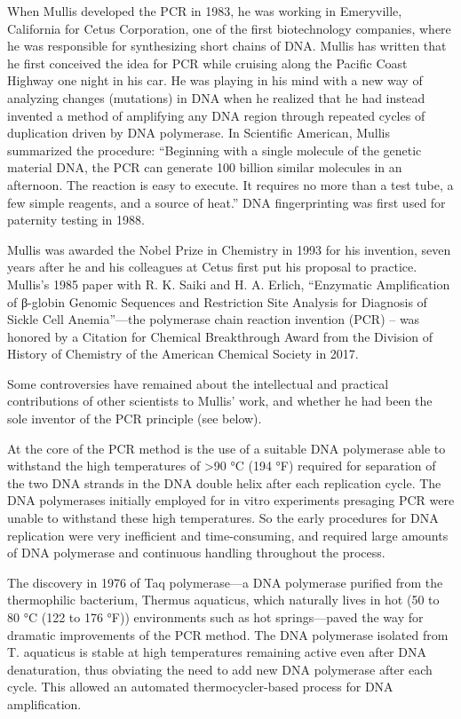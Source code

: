 When Mullis developed the PCR in 1983, he was working in Emeryville, California for Cetus Corporation, one of the first biotechnology companies, where he was responsible for synthesizing short chains of DNA. Mullis has written that he first conceived the idea for PCR while cruising along the Pacific Coast Highway one night in his car. He was playing in his mind with a new way of analyzing changes (mutations) in DNA when he realized that he had instead invented a method of amplifying any DNA region through repeated cycles of duplication driven by DNA polymerase. In Scientific American, Mullis summarized the procedure: ``Beginning with a single molecule of the genetic material DNA, the PCR can generate 100 billion similar molecules in an afternoon. The reaction is easy to execute. It requires no more than a test tube, a few simple reagents, and a source of heat.'' DNA fingerprinting was first used for paternity testing in 1988.

Mullis was awarded the Nobel Prize in Chemistry in 1993 for his invention, seven years after he and his colleagues at Cetus first put his proposal to practice. Mullis's 1985 paper with R. K. Saiki and H. A. Erlich, ``Enzymatic Amplification of β-globin Genomic Sequences and Restriction Site Analysis for Diagnosis of Sickle Cell Anemia''---the polymerase chain reaction invention (PCR) -- was honored by a Citation for Chemical Breakthrough Award from the Division of History of Chemistry of the American Chemical Society in 2017.

Some controversies have remained about the intellectual and practical contributions of other scientists to Mullis' work, and whether he had been the sole inventor of the PCR principle (see below).

At the core of the PCR method is the use of a suitable DNA polymerase able to withstand the high temperatures of \textgreater{}90 °C (194 °F) required for separation of the two DNA strands in the DNA double helix after each replication cycle. The DNA polymerases initially employed for in vitro experiments presaging PCR were unable to withstand these high temperatures. So the early procedures for DNA replication were very inefficient and time-consuming, and required large amounts of DNA polymerase and continuous handling throughout the process.

The discovery in 1976 of Taq polymerase---a DNA polymerase purified from the thermophilic bacterium, Thermus aquaticus, which naturally lives in hot (50 to 80 °C (122 to 176 °F)) environments such as hot springs---paved the way for dramatic improvements of the PCR method. The DNA polymerase isolated from T. aquaticus is stable at high temperatures remaining active even after DNA denaturation, thus obviating the need to add new DNA polymerase after each cycle. This allowed an automated thermocycler-based process for DNA amplification.

